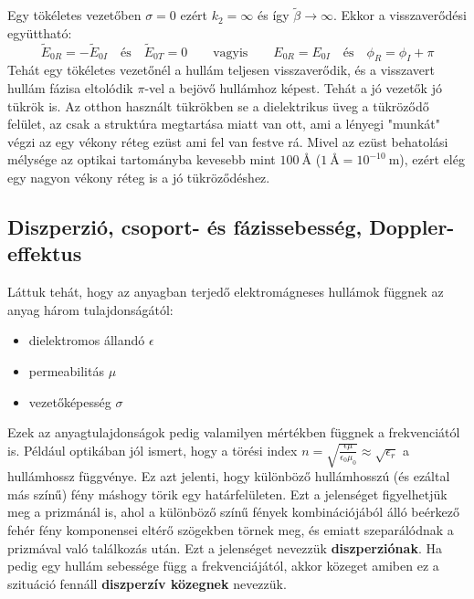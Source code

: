 \documentclass[../main.tex]{subfiles}
\begin{document}
Egy tökéletes vezetőben $\sigma = 0$ ezért $k_2 = \infty$ és így $\tilde{\beta} \rightarrow \infty$. Ekkor a visszaverődési együttható:
\begin{equation}
    \tilde{E}_{0R} = - \tilde{E}_{0I} \quad \text{és} \quad \tilde{E}_{0T} = 0 \qquad \text{vagyis} \qquad E_{0R} = E_{0I} \quad \text{és} \quad \phi_R = \phi_I + \pi
\end{equation}
Tehát egy tökéletes vezetőnél a hullám teljesen visszaverődik, és a visszavert hullám fázisa eltolódik $\pi$-vel a bejövő hullámhoz képest. Tehát a jó vezetők jó tükrök is.
Az otthon használt tükrökben se a dielektrikus üveg a tükröződő felület, az csak a struktúra megtartása miatt van ott, ami a lényegi "munkát" végzi az egy vékony réteg ezüst ami fel van festve rá.
Mivel az ezüst behatolási mélysége az optikai tartományba kevesebb mint $100 \: \text{\AA}$ ($1 \: \text{\AA} = 10^{-10} \: \text{m}$), ezért elég egy nagyon vékony réteg is a jó tükröződéshez.

\subsection{Diszperzió, csoport- és fázissebesség, Doppler-effektus}
Láttuk tehát, hogy az anyagban terjedő elektromágneses hullámok függnek az anyag három tulajdonságától:
\begin{itemize}
    \item dielektromos állandó $\epsilon$
    \item permeabilitás $\mu$
    \item vezetőképesség $\sigma$
\end{itemize}
Ezek az anyagtulajdonságok pedig valamilyen mértékben függnek a frekvenciától is. Például optikában jól ismert, hogy a törési index $n = \sqrt{\frac{\epsilon \mu}{\epsilon_0 \mu_0}} \approx \sqrt{\epsilon_r}$ a hullámhossz függvénye.
Ez azt jelenti, hogy különböző hullámhosszú (és ezáltal más színű) fény máshogy törik egy határfelületen. Ezt a jelenséget figyelhetjük meg a prizmánál is, ahol a különböző színű fények kombinációjából álló
beérkező fehér fény komponensei eltérő szögekben törnek meg, és emiatt szeparálódnak a prizmával való találkozás után. Ezt a jelenséget nevezzük \textbf{diszperziónak}. Ha pedig egy hullám sebessége függ a frekvenciájától, akkor közeget amiben ez a 
szituáció fennáll \textbf{diszperzív közegnek} nevezzük.
\end{document}
